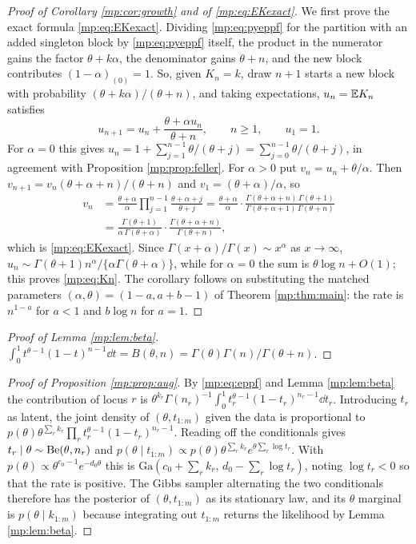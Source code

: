 \begin{proof}[Proof of Corollary \ref{mp:cor:growth} and of \eqref{mp:eq:EKexact}]
We first prove the exact formula \eqref{mp:eq:EKexact}. Dividing \eqref{mp:eq:pyeppf} for the
partition with an added singleton block by \eqref{mp:eq:pyeppf} itself, the product in the
numerator gains the factor $\theta+k\alpha$, the denominator gains $\theta+n$, and the new
block contributes $(1-\alpha)_{(0)}=1$. So, given $K_n=k$, draw $n+1$ starts a new block with
probability $(\theta+k\alpha)/(\theta+n)$, and taking expectations, $u_n=\mathbb{E} K_n$ satisfies
\[
u_{n+1}=u_n+\frac{\theta+\alpha u_n}{\theta+n},\qquad n\ge1,\qquad u_1=1 .
\]
For $\alpha=0$ this gives $u_n=1+\sum_{j=1}^{n-1}\theta/(\theta+j)=\sum_{j=0}^{n-1}\theta/(\theta+j)$,
in agreement with Proposition \ref{mp:prop:feller}. For $\alpha>0$ put $v_n=u_n+\theta/\alpha$.
Then $v_{n+1}=v_n(\theta+\alpha+n)/(\theta+n)$ and $v_1=(\theta+\alpha)/\alpha$, so
\[
\begin{aligned}
v_n&=\frac{\theta+\alpha}{\alpha}\prod_{j=1}^{n-1}\frac{\theta+\alpha+j}{\theta+j}
=\frac{\theta+\alpha}{\alpha}\cdot\frac{\Gamma(\theta+\alpha+n)\,\Gamma(\theta+1)}
{\Gamma(\theta+\alpha+1)\,\Gamma(\theta+n)}\\
&=\frac{\Gamma(\theta+1)}{\alpha\,\Gamma(\theta+\alpha)}\cdot
\frac{\Gamma(\theta+\alpha+n)}{\Gamma(\theta+n)},
\end{aligned}
\]
which is \eqref{mp:eq:EKexact}. Since $\Gamma(x+\alpha)/\Gamma(x)\sim x^\alpha$ as
$x\to\infty$, $u_n\sim\Gamma(\theta+1)n^\alpha/\{\alpha\Gamma(\theta+\alpha)\}$, while for
$\alpha=0$ the sum is $\theta\log n+O(1)$; this proves \eqref{mp:eq:Kn}. The corollary follows
on substituting the matched parameters $(\alpha,\theta)=(1-a,a+b-1)$ of Theorem
\ref{mp:thm:main}: the rate is $n^{1-a}$ for $a<1$ and $b\log n$ for $a=1$.
\end{proof}

\begin{proof}[Proof of Lemma \ref{mp:lem:beta}]
$\int_0^1t^{\theta-1}(1-t)^{n-1}\dd t=B(\theta,n)=\Gamma(\theta)\Gamma(n)/\Gamma(\theta+n)$.
\end{proof}

\begin{proof}[Proof of Proposition \ref{mp:prop:aug}]
By \eqref{mp:eq:eppf} and Lemma \ref{mp:lem:beta} the contribution of locus $r$ is
$\theta^{k_r}\Gamma(n_r)^{-1}\int_0^1t_r^{\theta-1}(1-t_r)^{n_r-1}\dd t_r$. Introducing
$t_r$ as latent, the joint density of $(\theta,t_{1:m})$ given the data is proportional to
$p(\theta)\theta^{\sum_rk_r}\prod_rt_r^{\theta-1}(1-t_r)^{n_r-1}$. Reading off the
conditionals gives $t_r\mid\theta\sim\mathrm{Be}(\theta,n_r)$ and
$p(\theta\mid t_{1:m})\propto p(\theta)\theta^{\sum_rk_r}e^{\theta\sum_r\log t_r}$. With
$p(\theta)\propto\theta^{c_0-1}e^{-d_0\theta}$ this is
$\mathrm{Ga}(c_0+\sum_rk_r,\,d_0-\sum_r\log t_r)$, noting $\log t_r<0$ so that the rate is
positive. The Gibbs sampler alternating the two conditionals therefore has the posterior of
$(\theta,t_{1:m})$ as its stationary law, and its $\theta$ marginal is $p(\theta\mid k_{1:m})$
because integrating out $t_{1:m}$ returns the likelihood by Lemma \ref{mp:lem:beta}.
\end{proof}

